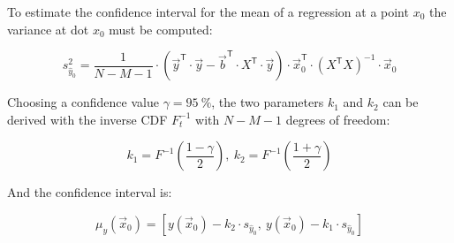 To estimate the confidence interval for the mean of a regression at a point $x_0$ the variance at dot $x_0$ must be computed: \cite{dffs}

\begin{equation}
s_{\hat{y}_0}^2 = \frac{1}{N-M-1}\cdot\left(\vec{y}^{\mathsf T}\cdot\vec{y}-\vec{b}^{\mathsf T}\cdot X^{\mathsf T}\cdot \vec{y}\right)\cdot \vec{x}_0^{\mathsf T}\cdot \left(X^{\mathsf T} X\right)^{-1} \cdot \vec{x}_0
\end{equation}

Choosing a confidence value $\gamma = \SI{95}{\percent}$, the two parameters $k_1$ and $k_2$ can be derived with the inverse \ac{CDF} $F_t^{-1}$ with $N-M-1$ degrees of freedom:

\begin{equation}
k_1 = F^{-1}\left(\frac{1-\gamma}{2}\right),\ k_2 = F^{-1}\left(\frac{1+\gamma}{2}\right)
\end{equation}

And the confidence interval is:

\begin{equation}
\mu_y\left(\vec{x}_0\right) =\left[ y\left(\vec{x}_0\right)-k_2\cdot s_{\hat{y}_0},\ y\left(\vec{x}_0\right)-k_1\cdot s_{\hat{y}_0}\right]
\label{eq:conv}
\end{equation}


